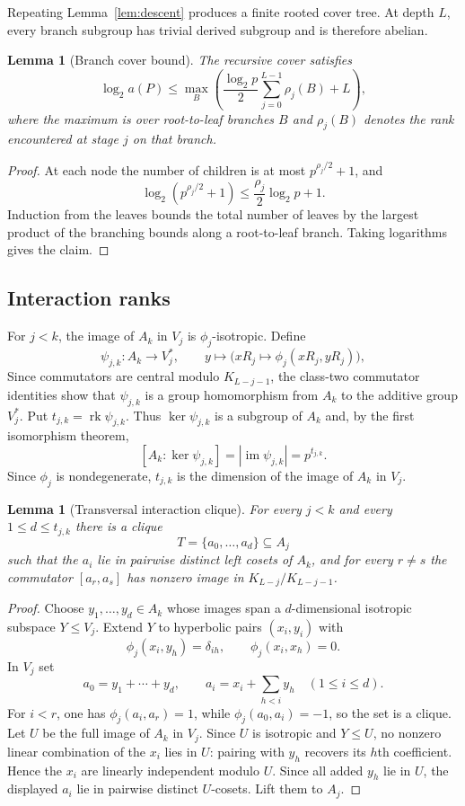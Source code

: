 \documentclass[11pt]{article}
\newtheorem{lemma}[theorem]{Lemma}
\theoremstyle{definition}
\theoremstyle{remark}
\newcommand{\rk}{\operatorname{rk}}
\begin{document}
Repeating Lemma~\ref{lem:descent} produces a finite rooted cover tree. At depth $L$, every branch subgroup has trivial derived subgroup and is therefore abelian.

\begin{lemma}[Branch cover bound]\label{lem:branch}
The recursive cover satisfies
\[
\log_2 a(P)\le \max_B\left(\frac{\log_2 p}{2}\sum_{j=0}^{L-1}\rho_j(B)+L\right),
\]
where the maximum is over root-to-leaf branches $B$ and $\rho_j(B)$ denotes the rank encountered at stage $j$ on that branch.
\end{lemma}

\begin{proof}
At each node the number of children is at most $p^{\rho_j/2}+1$, and
\[
\log_2(p^{\rho_j/2}+1)\le\frac{\rho_j}{2}\log_2p+1.
\]
Induction from the leaves bounds the total number of leaves by the largest product of the branching bounds along a root-to-leaf branch. Taking logarithms gives the claim.
\end{proof}

\subsection{Interaction ranks}

For $j<k$, the image of $A_k$ in $V_j$ is $\phi_j$-isotropic. Define
\[
\psi_{j,k}:A_k\longrightarrow V_j^*,\qquad y\longmapsto\bigl(xR_j\longmapsto\phi_j(xR_j,yR_j)\bigr),
\]
Since commutators are central modulo $K_{L-j-1}$, the class-two commutator identities show that $\psi_{j,k}$ is a group homomorphism from $A_k$ to the additive group $V_j^*$. Put $t_{j,k}=\rk\psi_{j,k}$. Thus $\ker\psi_{j,k}$ is a subgroup of $A_k$ and, by the first isomorphism theorem,
\[
[A_k:\ker\psi_{j,k}]=|\operatorname{im}\psi_{j,k}|=p^{t_{j,k}}.
\]
Since $\phi_j$ is nondegenerate, $t_{j,k}$ is the dimension of the image of $A_k$ in $V_j$.

\begin{lemma}[Transversal interaction clique]\label{lem:transversal}
For every $j<k$ and every $1\le d\le t_{j,k}$ there is a clique
\[
T=\{a_0,\ldots,a_d\}\subseteq A_j
\]
such that the $a_i$ lie in pairwise distinct left cosets of $A_k$, and for every $r\ne s$ the commutator $[a_r,a_s]$ has nonzero image in $K_{L-j}/K_{L-j-1}$.
\end{lemma}

\begin{proof}
Choose $y_1,\ldots,y_d\in A_k$ whose images span a $d$-dimensional isotropic subspace $Y\le V_j$. Extend $Y$ to hyperbolic pairs $(x_i,y_i)$ with
\[
\phi_j(x_i,y_h)=\delta_{ih},\qquad \phi_j(x_i,x_h)=0.
\]
In $V_j$ set
\[
a_0=y_1+\cdots+y_d,\qquad a_i=x_i+\sum_{h<i}y_h\quad(1\le i\le d).
\]
For $i<r$, one has $\phi_j(a_i,a_r)=1$, while $\phi_j(a_0,a_i)=-1$, so the set is a clique. Let $U$ be the full image of $A_k$ in $V_j$. Since $U$ is isotropic and $Y\le U$, no nonzero linear combination of the $x_i$ lies in $U$: pairing with $y_h$ recovers its $h$th coefficient. Hence the $x_i$ are linearly independent modulo $U$. Since all added $y_h$ lie in $U$, the displayed $a_i$ lie in pairwise distinct $U$-cosets. Lift them to $A_j$.
\end{proof}
\end{document}
